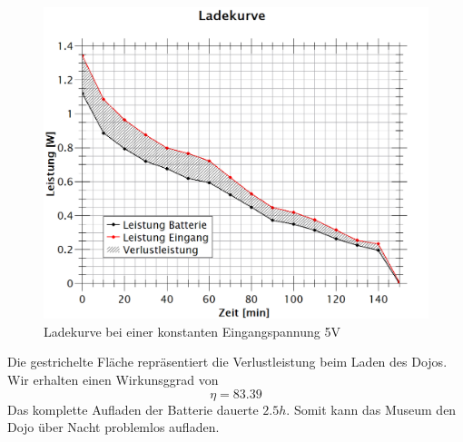\begin{figure}[htb]
	\centering
	\includegraphics[width=\textwidth]{graphics/ladekurve.png}
	\caption{Ladekurve bei einer konstanten Eingangspannung 5V}
	\label{fig:Ladeleistung}
\end{figure}

Die gestrichelte Fläche repräsentiert die Verlustleistung beim Laden des Dojos.
Wir erhalten einen Wirkunsggrad von
\begin{equation}
\eta = 83.39%
\end{equation}
Das komplette Aufladen der Batterie dauerte $2.5h$. Somit kann das Museum den Dojo über Nacht problemlos aufladen.